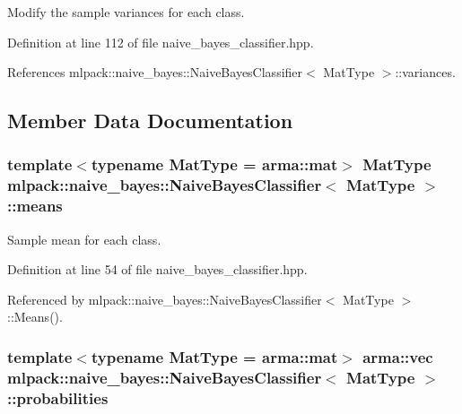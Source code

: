 Modify the sample variances for each class. 



Definition at line 112 of file naive\-\_\-bayes\-\_\-classifier.\-hpp.



References mlpack\-::naive\-\_\-bayes\-::\-Naive\-Bayes\-Classifier$<$ Mat\-Type $>$\-::variances.



\subsection{Member Data Documentation}
\subsubsection[{means}]{\setlength{\rightskip}{0pt plus 5cm}template$<$typename Mat\-Type  = arma\-::mat$>$ Mat\-Type {\bf mlpack\-::naive\-\_\-bayes\-::\-Naive\-Bayes\-Classifier}$<$ Mat\-Type $>$\-::means\hspace{0.3cm}{\ttfamily [private]}}\label{classmlpack_1_1naive__bayes_1_1NaiveBayesClassifier_af50fa618926013933a71f5185e4c829d}


Sample mean for each class. 



Definition at line 54 of file naive\-\_\-bayes\-\_\-classifier.\-hpp.



Referenced by mlpack\-::naive\-\_\-bayes\-::\-Naive\-Bayes\-Classifier$<$ Mat\-Type $>$\-::\-Means().

\subsubsection[{probabilities}]{\setlength{\rightskip}{0pt plus 5cm}template$<$typename Mat\-Type  = arma\-::mat$>$ arma\-::vec {\bf mlpack\-::naive\-\_\-bayes\-::\-Naive\-Bayes\-Classifier}$<$ Mat\-Type $>$\-::probabilities\hspace{0.3cm}{\ttfamily [private]}}\label{classmlpack_1_1naive__bayes_1_1NaiveBayesClassifier_abf6beeca22ee20c34d59f37b2591f052}


